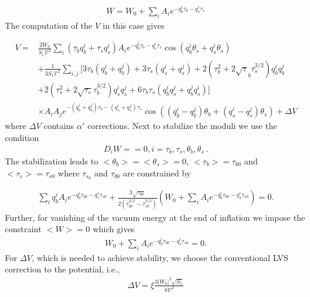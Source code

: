 \documentclass[12pt]{article}
\def\non{\nonumber\\}
\newcommand{\bl}[1]{{\color{blue}{#1}}}
\begin{document}
 \begin{align}
 W= W_0 +\sum_i A_i e^{-q^i_b \tau_b -q^i_s \tau_s}
  \end{align}
 The computation of the $V$ in this case gives
 
 
 \begin{align}
 V=& \frac{2 W_0}{S_1 \mathcal{V}^2} \sum_i (\tau_b q_b^i +\tau_s q_s^i) A_i e^{- q_b^i \tau_b - q_s^i \tau_s} \cos(q_b^i \theta_s + q^i_s \theta_s) \non 
& + \frac{1}{3 S_1\mathcal{V}^2} \sum_{i,j} \Big[3 \tau_b (q^i_b +q^j_b)  
 + 3\tau_s (q_s^i +q_s^j) 
 + 2 (\tau_b^2 + 2 \sqrt \tau_b \tau_s^{3/2}) q_b^i q_b^j \non
&+ 2(\tau^2_s+2 \sqrt{\tau_s} \tau^{3/2}_b) q_s^i q_s^j + 6 \tau_b \tau_s (q_b^i q_s^j + q_b^j q_s^i) \big]\non
&\times 
A_i A_j  e^{ -(q_b^i + q_b^j) \tau_b - (q_s^i + q_s^j)\tau_s} \cos\left((q_b^i -q_b^j)\theta_b + (q_s^i -q_s^j)\theta_s\right) + \Delta V
 \end{align}
 where $\Delta V$ contains $\alpha'$ corrections. Next to stabilize the moduli we use the condition 
 \begin{align}
 D_i W==0,  i= \tau_b, \tau_s, \theta_b, \theta_s\,.
 \end{align}
 The stabilization leads to $<\theta_b>=<\theta_s>=0$, $<\tau_b>=\tau_{b0}$ and $<\tau_{s}>= \tau_{s0}$ where 
 $\tau_{s_0}$ and $\tau_{b0}$ are  constrained by 
 
 \begin{align}
  \sum_i q^i_b A_i e^{-q_b^i \tau_{b0} - q^i_s \tau_{s0}} + 
 \frac{3 \sqrt {\tau_{b0}}}{2 (\tau^{3/2}_{b0}- \tau^{3/2}_{s0})} \left( W_0 + \sum_i A_i e^{-q^i_b \tau_{b0} - q_s^i \tau_{s0}} \right) =0.
 \label{lvs-stabiltiy-1}
 \end{align}
% 
 Further, for vanishing of the vacuum energy at the end of inflation we impose the constraint $<W>=0$ which gives
 \begin{align}
 W_0 + \sum_i A_i e^{- q_b^i \tau_{b0} - q_s^i \tau_{s0}} =0.
 \end{align}
 For $\Delta V$, which is needed to achieve stability, 
  we choose the conventional LVS correction to the potential, i.e., 
  \begin{align}
  \Delta V=  \xi \frac{3  |W_0|^2 \sqrt {S_1}}{8 \mathcal{V}^3}  
  \end{align}
   \bl{Max: Simulation part needs to be added here.}  
\end{document}
